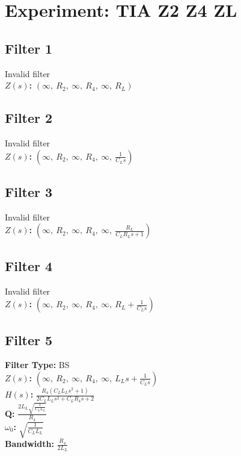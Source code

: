 \documentclass{article}
\begin{document}
        \section*{Experiment: TIA Z2 Z4 ZL}
\subsection*{Filter 1}
Invalid filter \\ 
\textbf{$Z(s)$:} $\left( \infty, \  R_{2}, \  \infty, \  R_{4}, \  \infty, \  R_{L}\right)$ \\ 
\subsection*{Filter 2}
Invalid filter \\ 
\textbf{$Z(s)$:} $\left( \infty, \  R_{2}, \  \infty, \  R_{4}, \  \infty, \  \frac{1}{C_{L} s}\right)$ \\ 
\subsection*{Filter 3}
Invalid filter \\ 
\textbf{$Z(s)$:} $\left( \infty, \  R_{2}, \  \infty, \  R_{4}, \  \infty, \  \frac{R_{L}}{C_{L} R_{L} s + 1}\right)$ \\ 
\subsection*{Filter 4}
Invalid filter \\ 
\textbf{$Z(s)$:} $\left( \infty, \  R_{2}, \  \infty, \  R_{4}, \  \infty, \  R_{L} + \frac{1}{C_{L} s}\right)$ \\ 
\subsection*{Filter 5}
\textbf{Filter Type:} BS \\ 
\textbf{$Z(s)$:} $\left( \infty, \  R_{2}, \  \infty, \  R_{4}, \  \infty, \  L_{L} s + \frac{1}{C_{L} s}\right)$ \\ 
\textbf{$H(s)$:} $\frac{R_{4} \left(C_{L} L_{L} s^{2} + 1\right)}{2 C_{L} L_{L} s^{2} + C_{L} R_{4} s + 2}$ \\ 
\textbf{Q:} $\frac{2 L_{L} \sqrt{\frac{1}{C_{L} L_{L}}}}{R_{4}}$ \\ 
\textbf{$\omega_0$:} $\sqrt{\frac{1}{C_{L} L_{L}}}$ \\ 
\textbf{Bandwidth:} $\frac{R_{4}}{2 L_{L}}$ \\ 
\end{document}
